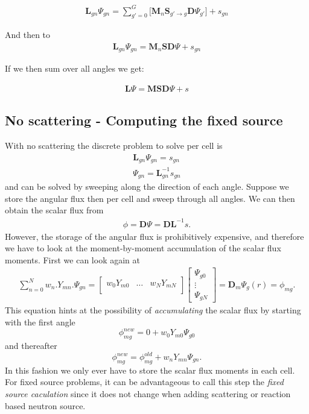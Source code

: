 \documentclass[11pt,letterpaper,titlepage]{article}
\numberwithin{equation}{section}
\begin{document}
\begin{align}
\mathbf{L}_{gn}\Psi_{gn} 
= \sum_{g'=0}^{G} \biggr[
\mathbf{M}_n \mathbf{S}_{g'{\to}g} \mathbf{D} \Psi_{g'}
\biggr]
+s_{gn}
\end{align}

And then to
\begin{align}
\mathbf{L}_{gn}\Psi_{gn} 
= \mathbf{M}_n \mathbf{S} \mathbf{D} \Psi
+s_{gn}
\end{align}

If we then sum over all angles we get:

\begin{align} \label{eq:NTEoperatorform}
\mathbf{L}\Psi 
= \mathbf{M} \mathbf{S} \mathbf{D} \Psi
+s
\end{align}


\subsection{No scattering - Computing the fixed source}
With no scattering the discrete problem to solve per cell is 
\begin{align*}
\mathbf{L}_{gn}\Psi_{gn} 
= 
s_{gn} \\
\Psi_{gn} 
= 
\mathbf{L}_{gn}^{-1} s_{gn} 
\end{align*}
and can be solved by sweeping along the direction of each angle. Suppose we store the angular flux then per cell and sweep through all angles. We can then obtain the scalar flux from
\begin{align*}
\phi = \mathbf{D}\Psi
= 
\mathbf{D}\mathbf{L}^{-1} s.
\end{align*}
However, the storage of the angular flux is prohibitively expensive, and therefore we have to look at the moment-by-moment accumulation of the scalar flux moments. First we can look again at 
\begin{align*}
\sum_{n=0}^{N} w_{n} . Y_{mn}.\Psi_{gn}
= 
\begin{bmatrix}
w_0 Y_{m0} &\hdots  &w_{N} Y_{mN}\\
\end{bmatrix}
\begin{bmatrix}
\Psi_{g0} \\
\vdots    \\
\Psi_{gN}
\end{bmatrix}
=\mathbf{D}_m\Psi_{g}(r) =\phi_{mg}.
\end{align*}
This equation hints at the possibility of \textit{accumulating} the scalar flux by starting with the first angle
$$\phi_{mg}^{new}=0+w_0 Y_{m0}\Psi_{g0}$$
and thereafter
$$\phi_{mg}^{new}=\phi_{mg}^{old}+w_n Y_{m n}\Psi_{gn}.$$
In this fashion we only ever have to store the scalar flux moments in each cell. For fixed source problems, it can be advantageous to call this step the \textit{fixed source caculation} since it does not change when adding scattering or reaction based neutron source.
\end{document}
